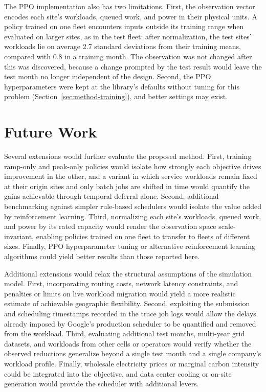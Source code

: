 \documentclass{UNCC-thesis}
\begin{document}
The PPO implementation also has two limitations. First, the observation vector encodes each site's
workloads, queued work, and power in their physical units. A policy trained on one fleet encounters
inputs outside its training range when evaluated on larger sites, as in the test fleet: after
normalization, the test sites' workloads lie on average 2.7 standard deviations from their
training means, compared with 0.8 in a training month. The observation was not changed after this was
discovered, because a change prompted by the test result would leave the test month no longer
independent of the design. Second, the PPO hyperparameters were kept at the library's defaults
without tuning for this problem (Section~\ref{sec:method-training}), and better settings may exist.

\section{Future Work}
\label{sec:discussion-future}

Several extensions would further evaluate the proposed method. First, training ramp-only and
peak-only policies would isolate how strongly each objective drives improvement in the other, and a
variant in which service workloads remain fixed at their origin sites and only batch jobs are
shifted in time would quantify the gains achievable through temporal deferral alone. Second,
additional benchmarking against simpler rule-based schedulers would isolate the value added by
reinforcement learning. Third, normalizing each site's workloads, queued work, and power by its
rated capacity would render the observation space scale-invariant, enabling policies trained on one
fleet to transfer to fleets of different sizes. Finally, PPO hyperparameter tuning or alternative
reinforcement learning algorithms could yield better results than those reported here.

Additional extensions would relax the structural assumptions of the simulation model. First,
incorporating routing costs, network latency constraints, and penalties or limits on live workload
migration would yield a more realistic estimate of achievable geographic flexibility. Second,
exploiting the submission and scheduling timestamps recorded in the trace job logs would allow the
delays already imposed by Google's production scheduler to be quantified and removed from the
workload. Third, evaluating additional test months, multi-year grid datasets, and workloads from
other cells or operators would verify whether the observed reductions generalize beyond a single
test month and a single company's workload profile. Finally, wholesale electricity prices or
marginal carbon intensity could be integrated into the objective, and data center cooling or
on-site generation would provide the scheduler with additional levers.
\end{document}

